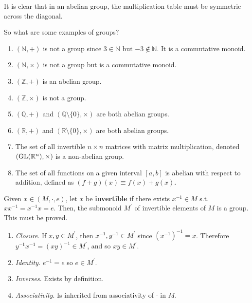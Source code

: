   It is clear that in an abelian group, the multiplication table must be symmetric across the diagonal. 

  \begin{example}
    So what are some examples of groups? 
    \begin{enumerate}
      \item $(\mathbb{N}, +)$ is not a group since $3 \in \mathbb{N}$ but $-3 \not\in \mathbb{N}$. It is a commutative monoid. 
      \item $(\mathbb{N}, \times)$ is not a group but is a commutative monoid. 
      \item $(\mathbb{Z}, +)$ is an abelian group. 
      \item $(\mathbb{Z}, \times)$ is not a group. 
      \item $(\mathbb{Q}, +)$ and $(\mathbb{Q} \setminus \{0\}, \times)$ are both abelian groups. 
      \item $(\mathbb{R}, +)$ and $(\mathbb{R} \setminus \{0\}, \times)$ are both abelian groups. 
      \item The set of all invertible $n \times n$ matrices with matrix multiplication, denoted $(\GL (\mathbb{R}^n), \times)$ is a non-abelian group. 
      \item The set of all functions on a given interval $[a,b]$ is abelian with respect to addition, defined as $(f+g)(x) \equiv f(x) + g(x)$. 
    \end{enumerate}
  \end{example}

  \begin{example}
    Given $x \in (M, \cdot, e)$, let $x$ be \textbf{invertible} if there exists $x^{-1} \in M$ s.t. $x x^{-1} = x^{-1} x = e$. Then, the submonoid $M^\prime$ of invertible elements of $M$ is a group. This must be proved. 
    \begin{enumerate}
      \item \textit{Closure}. If $x, y \in M^\prime$, then $x^{-1}, y^{-1} \in M^\prime$ since $(x^{-1})^{-1} = x$. Therefore $y^{-1} x^{-1} = (xy)^{-1} \in M^\prime$, and so $xy \in M^\prime$. 
      \item \textit{Identity}. $e^{-1} = e$ so $e \in M^\prime$. 
      \item \textit{Inverses}. Exists by definition. 
      \item \textit{Associativity}. Is inherited from associativity of $\cdot$ in $M$. 
    \end{enumerate}
  \end{example}

